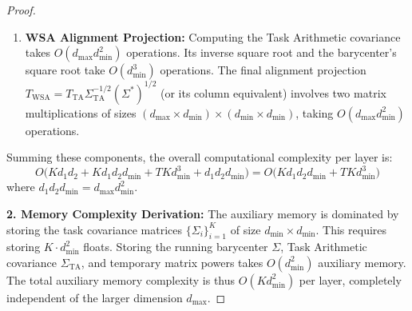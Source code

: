 \documentclass{article}
\theoremstyle{plain}
\theoremstyle{definition}
\theoremstyle{remark}
\begin{document}
\begin{proof}
\begin{enumerate}
\begin{itemize}
    \item The final multiplication and addition of the updated covariance $\Sigma^{(t+1)} = \Sigma_t^{-1/2} (\sum \lambda_i A^{1/2})^2 \Sigma_t^{-1/2}$ takes $O(d_{\min}^3)$ operations.
  \end{itemize}
  Thus, each iteration takes $O(K d_{\min}^3)$ operations, resulting in a total of $O(T K d_{\min}^3)$ operations for $T$ iterations.
  \item \textbf{WSA Alignment Projection:} Computing the Task Arithmetic covariance takes $O(d_{\max} d_{\min}^2)$ operations. Its inverse square root and the barycenter's square root take $O(d_{\min}^3)$ operations. The final alignment projection $T_{\text{WSA}} = T_{\text{TA}} \Sigma_{\text{TA}}^{-1/2} (\Sigma^*)^{1/2}$ (or its column equivalent) involves two matrix multiplications of sizes $(d_{\max} \times d_{\min}) \times (d_{\min} \times d_{\min})$, taking $O(d_{\max} d_{\min}^2)$ operations.
\end{enumerate}
Summing these components, the overall computational complexity per layer is:
\begin{equation}
  O\Big( K d_1 d_2 + K d_1 d_2 d_{\min} + T K d_{\min}^3 + d_1 d_2 d_{\min} \Big) = O\Big( K d_1 d_2 d_{\min} + T K d_{\min}^3 \Big)
\end{equation}
where $d_1 d_2 d_{\min} = d_{\max} d_{\min}^2$.

\textbf{2. Memory Complexity Derivation:}
The auxiliary memory is dominated by storing the task covariance matrices $\{\Sigma_i\}_{i=1}^K$ of size $d_{\min} \times d_{\min}$. This requires storing $K \cdot d_{\min}^2$ floats. Storing the running barycenter $\Sigma$, Task Arithmetic covariance $\Sigma_{\text{TA}}$, and temporary matrix powers takes $O(d_{\min}^2)$ auxiliary memory. The total auxiliary memory complexity is thus $O(K d_{\min}^2)$ per layer, completely independent of the larger dimension $d_{\max}$.


\end{proof}
\end{document}
